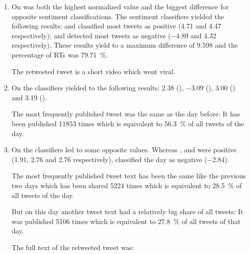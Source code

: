 \begin{enumerate}
    \item 
        On  was both the highest normalized value and the biggest difference for opposite sentiment classifications.
        The sentiment classifiers yielded the following results: \ftb{} and \fme{} classified most tweets as positive (\num{4.71} and \num{4.47} respectively); \fnb{} and \fsvm{} detected most tweets as negative (\num{-4.89} and \num{4.32} respectively).
        These results yield to a maximum difference of \num{9.598} and the percentage of \acp{RT} was \SI{79.71}{\percent}.


        The retweeted tweet is a short video which went viral.
        \nocite{tweet.toyota.1}

    \item 
        On  the classifiers yielded to the following results: 
        \num{2.38} (\ftb{}), \num{-3.09} (\fnb{}), \num{3.00} (\fme{}) and \num{3.19} (\fsvm{}).

        The most frequently published tweet was the same as the day before:
        It has been published \num{11853} times which is equivalent to \SI{56.3}{\percent} of all tweets of the day.
    
    \item 
        On  the classifiers led to some opposite values. 
        Whereas \ftb{}, \fme{} and \fsvm{} were positive (\num{1.91}, \num{2.76} and \num{2.76} respectively), \fnb{} classified the day as negative (\num{-2.84}).
        
        The most frequently published tweet text has been the same like the previous two days which has been shared \num{5224} times which is equivalent to \SI{28.5}{\percent} of all tweets of the day.

        But on this day another tweet text had a relatively big share of all tweets:
        It was published \num{5106} times which is equivalent to \SI{27.8}{\percent} of all tweets of that day.

        The full text of the retweeted tweet was:

\end{enumerate}

